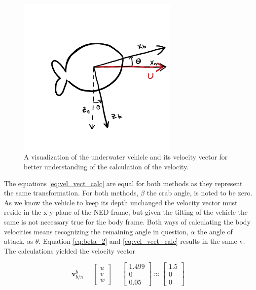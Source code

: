 \begin{figure}[!htb]
	\centering
	\includegraphics[width=0.70\textwidth]{figures/angleOfAttackImg.png}
	\caption{A visualization of the underwater vehicle and its velocity vector for better understanding of the calculation of the velocity.}
\label{fig:angleOfAttackImg}
\end{figure}

The equations \eqref{eq:vel_vect_calc} are equal for both methods as they represent the same transformation. For both methods, $\beta$ the crab angle, is noted to be zero.  As we know the vehicle to keep its depth unchanged the velocity vector must reside in the x-y-plane of the NED-frame, but given the tilting of the vehicle the same is not necessary true for the body frame. Both ways of calculating the body velocities means recognizing the remaining angle in question, $\alpha$ the angle of attack, as $\theta$. Equation \eqref{eq:beta_2} and \eqref{eq:vel_vect_calc} results in the same v. The calculations yielded the velocity vector

\begin{equation}
    \mathbf{v}^b_{b/n} =
    \begin{bmatrix}
		u \\
		v \\
		w
	\end{bmatrix}
	= 
	\begin{bmatrix}
		1.499 \\
		0 \\
		0.05	
	\end{bmatrix}
	\approx 
	\begin{bmatrix}
		1.5 \\
		0 \\
		0	
	\end{bmatrix}
\end{equation}

